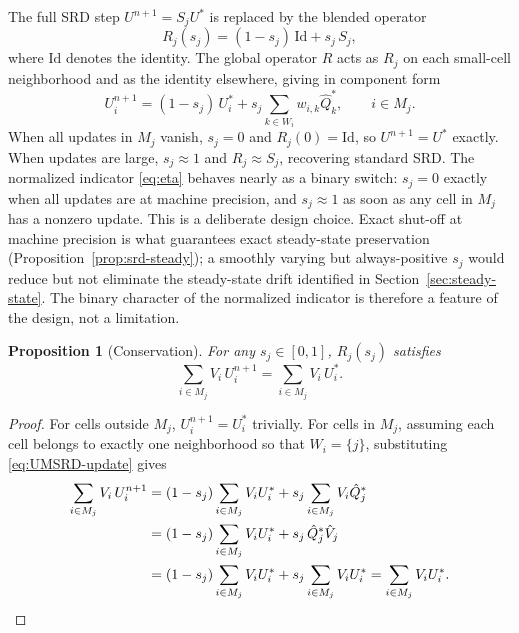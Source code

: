 \documentclass[11pt]{article}
\newtheorem{proposition}{Proposition}
\begin{document}
The full SRD step $U^{n+1} = S_j U^*$ is replaced by the blended operator
\begin{equation}
  R_j(s_j) = (1 - s_j)\,\mathrm{Id} + s_j\,S_j,
  \label{eq:Rj}
\end{equation}
where $\mathrm{Id}$ denotes the identity. The global operator $R$ acts as 
$R_j$ on each small-cell neighborhood and as the identity elsewhere, giving 
in component form
\begin{equation}
  U^{n+1}_i = (1 - s_j)\,U^*_i + s_j \sum_{k \in W_i} w_{i,k} \hat{Q}^*_k,
  \qquad i \in M_j.
  \label{eq:UMSRD-update}
\end{equation}
When all updates in $M_j$ vanish, $s_j = 0$ and $R_j(0) = \mathrm{Id}$, 
so $U^{n+1} = U^*$ exactly. When updates are large, $s_j \approx 1$ and 
$R_j \approx S_j$, recovering standard SRD. The normalized indicator 
\eqref{eq:eta} behaves nearly as a binary switch: $s_j = 0$ exactly when 
all updates are at machine precision, and $s_j \approx 1$ as soon as any 
cell in $M_j$ has a nonzero update. This is a deliberate design choice. 
Exact shut-off at machine precision is what guarantees exact steady-state 
preservation (Proposition~\ref{prop:srd-steady}); a smoothly varying but 
always-positive $s_j$ would reduce but not eliminate the steady-state drift 
identified in Section~\ref{sec:steady-state}. The binary character of the 
normalized indicator is therefore a feature of the design, not a limitation.

\begin{proposition}[Conservation]
\label{prop:conservation}
For any $s_j \in [0,1]$, $R_j(s_j)$ satisfies
\[
  \sum_{i \in M_j} V_i\, U^{n+1}_i = \sum_{i \in M_j} V_i\, U^*_i.
\]
\end{proposition}

\begin{proof}
For cells outside $M_j$, $U^{n+1}_i = U^*_i$ trivially. For cells in 
$M_j$, assuming each cell belongs to exactly one neighborhood so that 
$W_i = \{j\}$, substituting \eqref{eq:UMSRD-update} gives
\begin{align*}
  \sum_{i \in M_j} V_i\,U^{n+1}_i
  &= (1-s_j)\sum_{i \in M_j} V_i U^*_i
     + s_j \sum_{i \in M_j} V_i \hat{Q}^*_j \\
  &= (1-s_j)\sum_{i \in M_j} V_i U^*_i
     + s_j\, \hat{Q}^*_j \hat{V}_j \\
  &= (1-s_j)\sum_{i \in M_j} V_i U^*_i
     + s_j \sum_{i \in M_j} V_i U^*_i
   = \sum_{i \in M_j} V_i U^*_i. \qedhere
\end{align*}
\end{proof}
\end{document}
